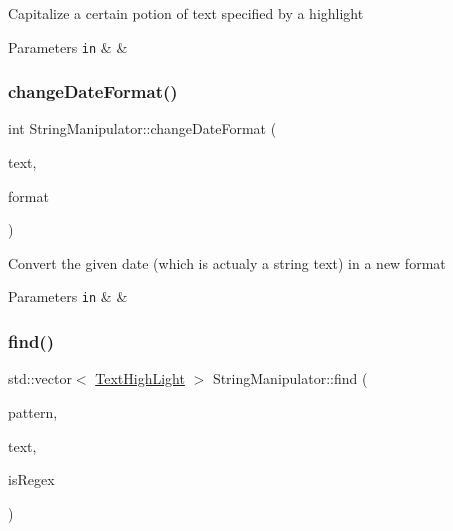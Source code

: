 Capitalize a certain potion of text specified by a highlight


\begin{DoxyParams}[1]{Parameters}
\mbox{\tt in}  & {\em } & \\
\hline
\end{DoxyParams}
\mbox{\label{class_string_manipulator_a88bd80f0412cc80d18a1acbc9b838489}} 
\subsubsection{\texorpdfstring{change\+Date\+Format()}{changeDateFormat()}}
{\footnotesize\ttfamily int String\+Manipulator\+::change\+Date\+Format (\begin{DoxyParamCaption}\item[{std\+::string \&}]{text,  }\item[{date\+Format}]{format }\end{DoxyParamCaption})\hspace{0.3cm}{\ttfamily [static]}}

Convert the given date (which is actualy a string text) in a new format


\begin{DoxyParams}[1]{Parameters}
\mbox{\tt in}  & {\em } & \\
\hline
\end{DoxyParams}
\mbox{\label{class_string_manipulator_afc935f4ef36a3683bf4a0b7db2b354db}} 
\subsubsection{\texorpdfstring{find()}{find()}}
{\footnotesize\ttfamily std\+::vector$<$ \hyperlink{class_text_high_light}{Text\+High\+Light} $>$ String\+Manipulator\+::find (\begin{DoxyParamCaption}\item[{const std\+::string \&}]{pattern,  }\item[{const std\+::string \&}]{text,  }\item[{const bool}]{is\+Regex }\end{DoxyParamCaption})\hspace{0.3cm}{\ttfamily [static]}}

